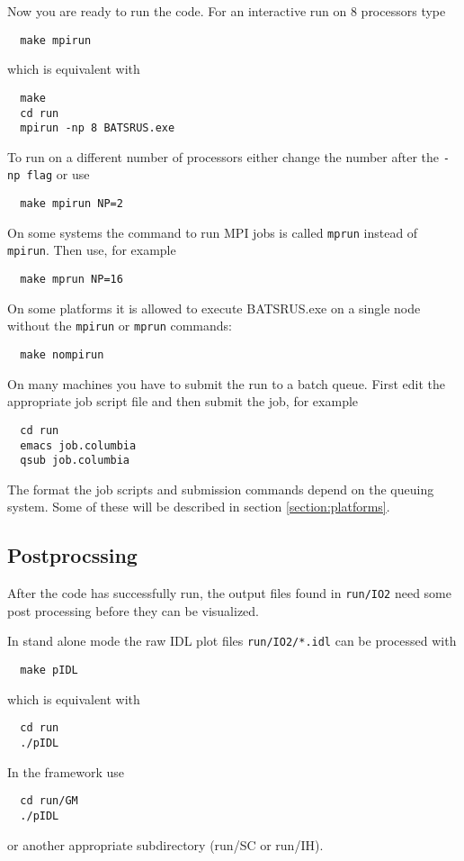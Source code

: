 Now you are ready to run the code. For an interactive run
on 8 processors type
\begin{verbatim}
  make mpirun
\end{verbatim}
which is equivalent with
\begin{verbatim}
  make
  cd run
  mpirun -np 8 BATSRUS.exe
\end{verbatim}
To run on a different number of processors either change the number
after the {\tt -np flag} or use
\begin{verbatim}
  make mpirun NP=2
\end{verbatim}
On some systems the command to run MPI jobs is called {\tt mprun}
instead of {\tt mpirun}. Then use, for example
\begin{verbatim}
  make mprun NP=16
\end{verbatim}
On some platforms it is allowed to execute BATSRUS.exe on a single node 
without the {\tt mpirun} or {\tt mprun} commands:
\begin{verbatim}
  make nompirun
\end{verbatim}
On many machines you have to submit the run to a batch queue.
First edit the appropriate job script file and then submit the job,
for example
\begin{verbatim}
  cd run
  emacs job.columbia 
  qsub job.columbia
\end{verbatim}
The format the job scripts and submission commands depend on
the queuing system. Some of these will be described in 
section \ref{section:platforms}.

\subsection{Postprocssing}

After the code has successfully run, the output files 
found in {\tt run/IO2} need some post processing before 
they can be visualized. 

In stand alone mode the raw IDL plot files {\tt run/IO2/*.idl}
can be processed with
\begin{verbatim}
  make pIDL
\end{verbatim}
which is equivalent with
\begin{verbatim}
  cd run
  ./pIDL
\end{verbatim}
In the framework use
\begin{verbatim}
  cd run/GM
  ./pIDL
\end{verbatim}
or another appropriate subdirectory (run/SC or run/IH).

